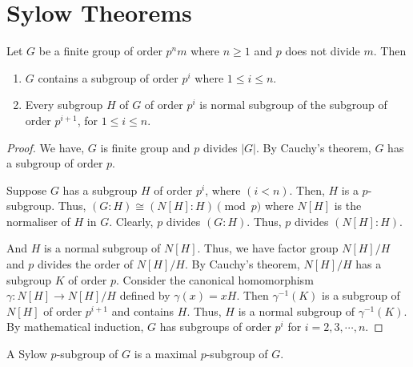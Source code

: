 \section{Sylow Theorems}
\begin{theorem}
	Let $G$ be a finite group of order $p^n m$ where $n \ge 1$ and $p$ does not divide $m$. Then
	\begin{enumerate}
		\item $G$ contains a subgroup of order $p^i$ where $1 \le i \le n$.
		\item Every subgroup $H$ of $G$ of order $p^i$ is normal subgroup of the subgroup of order $p^{i+1}$, for $1 \le i \le n$.
	\end{enumerate}
\end{theorem}
\begin{proof}
	We have, $G$ is finite group and $p$ divides $|G|$.
	By Cauchy's theorem, $G$ has a subgroup of order $p$.

	Suppose $G$ has a subgroup $H$ of order $p^i$, where $(i < n)$.
	Then, $H$ is a $p$-subgroup.
	Thus, $(G:H) \cong (N[H]:H) \pmod{p}$ where $N[H]$ is the normaliser of $H$ in $G$.
	Clearly, $p$ divides $(G:H)$.
	Thus, $p$ divides $(N[H]:H)$.

	And $H$ is a normal subgroup of $N[H]$.
	Thus, we have factor group $N[H]/H$ and $p$ divides the order of $N[H]/H$.
	By Cauchy's theorem, $N[H]/H$ has a subgroup $K$ of order $p$.
	Consider the canonical homomorphism $\gamma : N[H] \to N[H]/H$ defined by $\gamma(x) = xH$.
	Then $\gamma^{-1}(K)$ is a subgroup of $N[H]$ of order $p^{i+1}$ and contains $H$.
	Thus, $H$ is a normal subgroup of $\gamma^{-1}(K)$.
	By mathematical induction, $G$ has subgroups of order $p^i$ for $i = 2,3,\cdots,n$.
\end{proof}

\begin{definition}
	A Sylow $p$-subgroup of $G$ is a maximal $p$-subgroup of $G$.
\end{definition}

